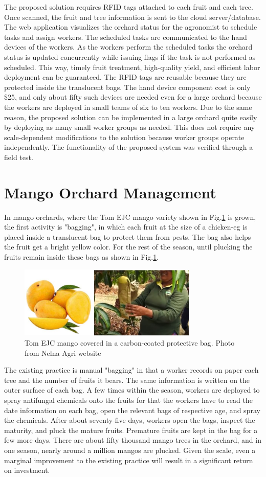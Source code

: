 \documentclass[journal]{IEEEtran}
\begin{document}
The proposed solution requires RFID tags attached to each fruit and each tree. Once scanned, the fruit and tree information is sent to the cloud server/database. The web application visualizes the orchard status for the agronomist to schedule tasks and assign workers. The scheduled tasks are communicated to the hand devices of the workers. As the workers perform the scheduled tasks the orchard status is updated concurrently while issuing flags if the task is not performed as scheduled. This way, timely fruit treatment, high-quality yield, and efficient labor deployment can be guaranteed. The RFID tags are reusable because they are protected inside the translucent bags. The hand device component cost is only \$25, and only about fifty such devices are needed even for a large orchard because the workers are deployed in small teams of six to ten workers. Due to the same reason, the proposed solution can be implemented in a large orchard quite easily by deploying as many small worker groups as needed. This does not require any scale-dependent modifications to the solution because worker groups operate independently. The functionality of the proposed system was verified through a field test.
\section{Mango Orchard Management}
In mango orchards, where the Tom EJC mango variety shown in Fig.\ref{fig_TomEJC} is grown, the first activity is "bagging", in which each fruit at the size of a chicken-eg is placed inside a translucent bag to protect them from pests. The bag also helps the fruit get a bright yellow color. For the rest of the season, until plucking the fruits remain inside these bags as shown in Fig.\ref{fig_TomEJC}.
\begin{figure}[h]
	\centering
	\includegraphics[width = 8.5cm]{graphics/TomEJC.png}
	\caption{Tom EJC mango covered in a carbon-coated protective bag. Photo from Nelna Agri website}
	\label{fig_TomEJC}
\end{figure}
The existing practice is manual "bagging" in that a worker records on paper each tree and the number of fruits it bears. The same information is written on the outer surface of each bag. A few times within the season, workers are deployed to spray antifungal chemicals onto the fruits for that the workers have to read the date information on each bag, open the relevant bags of respective age, and spray the chemicals. After about seventy-five days, workers open the bags, inspect the maturity, and pluck the mature fruits. Premature fruits are kept in the bag for a few more days. There are about fifty thousand mango trees in the orchard, and in one season, nearly around a million mangos are plucked. Given the scale, even a marginal improvement to the existing practice will result in a significant return on investment.
\end{document}
